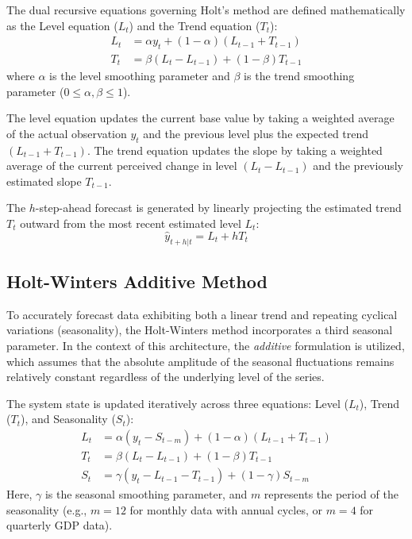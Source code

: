 The dual recursive equations governing Holt's method are defined mathematically as the Level equation ($L_t$) and the Trend equation ($T_t$):
\begin{align}
    L_t &= \alpha y_t + (1 - \alpha)(L_{t-1} + T_{t-1}) \\
    T_t &= \beta (L_t - L_{t-1}) + (1 - \beta)T_{t-1}
\end{align}
where $\alpha$ is the level smoothing parameter and $\beta$ is the trend smoothing parameter ($0 \le \alpha, \beta \le 1$). 

The level equation updates the current base value by taking a weighted average of the actual observation $y_t$ and the previous level plus the expected trend $(L_{t-1} + T_{t-1})$. The trend equation updates the slope by taking a weighted average of the current perceived change in level $(L_t - L_{t-1})$ and the previously estimated slope $T_{t-1}$.

The $h$-step-ahead forecast is generated by linearly projecting the estimated trend $T_t$ outward from the most recent estimated level $L_t$:
\begin{equation}
    \hat{y}_{t+h|t} = L_t + h T_t
\end{equation}

\subsection{Holt-Winters Additive Method}
To accurately forecast data exhibiting both a linear trend and repeating cyclical variations (seasonality), the Holt-Winters method incorporates a third seasonal parameter. In the context of this architecture, the \textit{additive} formulation is utilized, which assumes that the absolute amplitude of the seasonal fluctuations remains relatively constant regardless of the underlying level of the series.

The system state is updated iteratively across three equations: Level ($L_t$), Trend ($T_t$), and Seasonality ($S_t$):
\begin{align}
    L_t &= \alpha (y_t - S_{t-m}) + (1 - \alpha)(L_{t-1} + T_{t-1}) \\
    T_t &= \beta (L_t - L_{t-1}) + (1 - \beta)T_{t-1} \\
    S_t &= \gamma (y_t - L_{t-1} - T_{t-1}) + (1 - \gamma)S_{t-m}
\end{align}
Here, $\gamma$ is the seasonal smoothing parameter, and $m$ represents the period of the seasonality (e.g., $m=12$ for monthly data with annual cycles, or $m=4$ for quarterly GDP data). 

